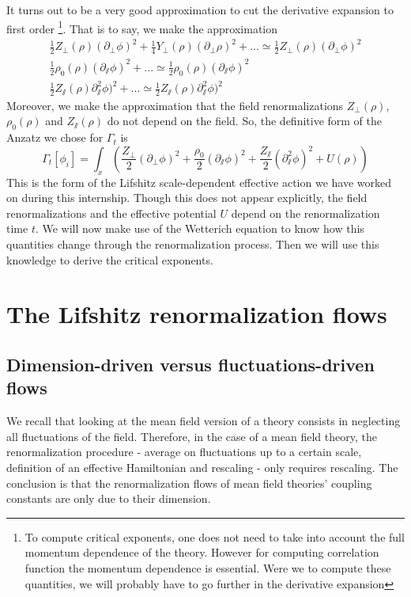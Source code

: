 It turns out to be a very good approximation to cut the derivative expansion to first order \footnote{To compute critical exponents, one does not need to take into account the full momentum dependence of the theory. However for computing correlation function the momentum dependence is essential. Were we to compute these quantities, we will probably have to go further in the derivative expansion}. That is to say, we make the approximation
\begin{eqnarray}
\frac{1}{2} Z_\perp(\rho) (\partial_\perp \phi)^2 + \frac{1}{4} Y_\perp(\rho) (\partial_\perp \rho)^2 + ...  \simeq  \frac{1}{2} Z_\perp(\rho) (\partial_\perp \phi)^2  \\
 \frac{1}{2} \rho_0(\rho) (\partial_\sslash \phi)^2 + ...  \simeq  \frac{1}{2} \rho_0(\rho) (\partial_\sslash \phi)^2 \\
\frac{1}{2} Z_\sslash(\rho) \partial_\sslash^2 \phi)^2 + ... \simeq \frac{1}{2} Z_\sslash(\rho) \partial_\sslash^2 \phi)^2
\end{eqnarray}
Moreover, we make the approximation that the field renormalizations $Z_\perp(\rho)$, $\rho_0(\rho)$ and $Z_\sslash(\rho)$ do not depend on the field. So, the definitive form of the Anzatz we chose for $\Gamma_t$ is
\begin{equation}
\label{eq:gamlif}
\Gamma_t[\phi_i] = \int_x \left ( \frac{Z_\perp}{2} (\partial_\perp \phi)^2 + \frac{\rho_0}{2} (\partial_\sslash \phi)^2 + \frac{Z_\sslash}{2} (\partial_\sslash^2 \phi)^2 + U(\rho) \right )
\end{equation}
This is the form of the Lifshitz scale-dependent effective action we have worked on during this internship.
Though this does not appear explicitly, the field renormalizations and the effective potential $U$ depend on the renormalization time $t$. We will now make use of the Wetterich equation to know how this quantities change through the renormalization process. Then we will use this knowledge to derive the critical exponents.

\section{The Lifshitz renormalization flows}

\subsection{Dimension-driven versus fluctuations-driven flows}
We recall that looking at the mean field version of a theory consists in neglecting all fluctuations of the field. Therefore, in the case of a mean field theory, the renormalization procedure - average on fluctuations up to a certain scale, definition of an effective Hamiltonian and rescaling - only requires rescaling. 
The conclusion is that the renormalization flows of mean field theories' coupling constants are only due to their dimension.

